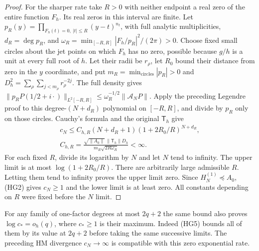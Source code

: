 \documentclass[11pt]{article}
\begin{document}
\begin{proof}
For the sharper rate take $R>0$ with neither endpoint a real zero
of the entire function $F_h$. Its real zeros in this interval are
finite. Let $p_R(y)=\prod_{F_h(t)=0,\ |t|\le R}(y-t)^{n_t}$,
with full analytic multiplicities, $d_R=\deg p_R$, and
$\omega_R=\min_{[-R,R]}|F_h/p_R|^2/(2\pi)>0$.
Choose fixed small circles about the jet points on which $F_h$ has no
zero, possible because $g/h$ is a unit at every full root of $h$.
Let their radii be $r_\rho$, let $R_0$ bound their distance from zero
in the $y$ coordinate, and put
$m_R=\min_{\text{circles}}|p_R|>0$ and
$D_h^2=\sum_{\rho}\sum_{j<m_\rho}r_\rho^{-2j}$.
The full density gives
$\|p_R P(1/2+i\cdot)\|_{L^2[-R,R]}
\le\omega_R^{-1/2}\|\mathcal A_NP\|$.
Apply the preceding Legendre proof to this degree-$(N+d_R)$
polynomial on $[-R,R]$, and divide by $p_R$ only on those circles.
Cauchy's formula and the original $\mathsf T_h$ give
\[
 \begin{gathered}
 c_N\le C_{h,R}(N+d_R+1)(1+2R_0/R)^{N+d_R},\\
 C_{h,R}=\frac{\sqrt{\|A_0\|}\,\|\mathsf T_h\|D_h}
                    {m_R\sqrt{2R\omega_R}}<\infty .
 \end{gathered}\tag{HG5}
\]
For each fixed $R$, divide its logarithm by $N$ and let $N$ tend
to infinity. The upper limit is at most $\log(1+2R_0/R)$.
There are arbitrarily large admissible $R$. Letting them tend to
infinity proves the upper limit zero. Since $H_N^{(1)}\preceq A_0$,
(HG2) gives $c_N\ge1$ and the lower limit is at least zero.
All constants depending on $R$ were fixed before the $N$ limit.
\end{proof}
For any family of one-factor degrees at most $2q+2$ the same bound
also proves $\log c_*=o_h(q)$, where $c_*\ge1$ is their maximum.
Indeed (HG5) bounds all of them by its value at $2q+2$ before
taking the same successive limits. The preceding HM divergence
$c_N\to\infty$ is compatible with this zero exponential rate.
\end{document}
